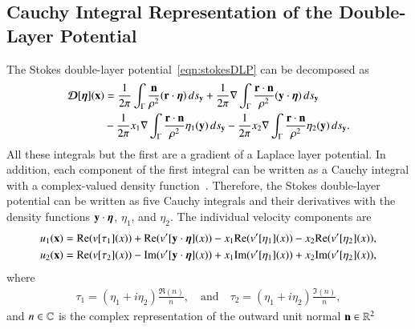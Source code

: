 \documentclass[preprint, 10pt]{elsarticle}
\begin{document}
\subsection{Cauchy Integral Representation of the Double-Layer
Potential}
The Stokes double-layer potential~\eqref{eqn:stokesDLP} can be
decomposed as
\begin{align}
  {\boldsymbol{\mathcal D}}[{\boldsymbol\eta}]({\mathbf{x}}) &= 
    \frac{1}{2\pi} \int_{\Gamma} 
      \frac{{\mathbf{n}}}{\rho^2} ({\mathbf{r}} \cdot {\boldsymbol\eta}) \, ds_{\mathbf{y}} + 
    \frac{1}{2\pi} \nabla \int_{\Gamma}
      \frac{{\mathbf{r}} \cdot {\mathbf{n}}}{\rho^2} ({\mathbf{y}} \cdot {\boldsymbol\eta}) \, ds_{\mathbf{y}} \\
    &- \frac{1}{2\pi} x_1 \nabla \int_{\Gamma}
      \frac{{\mathbf{r}} \cdot {\mathbf{n}}}{\rho^2}\eta_1({\mathbf{y}}) \, ds_{\mathbf{y}} -
    \frac{1}{2\pi} x_2 \nabla \int_{\Gamma}
      \frac{{\mathbf{r}} \cdot {\mathbf{n}}}{\rho^2}\eta_2({\mathbf{y}}) \, ds_{\mathbf{y}}.
\end{align}
All these integrals but the first are a gradient of a Laplace layer
potential.  In addition, each component of the first integral can be
written as a Cauchy integral with a complex-valued density
function~\cite{bar-wu-vee2015}.  Therefore, the Stokes double-layer
potential can be written as five Cauchy integrals and their derivatives
with the density functions ${\mathbf{y}} \cdot {\boldsymbol\eta}$, $\eta_1$, and $\eta_2$.
The individual velocity components are
\begin{align}
  \label{eqn:cauchy1}
  u_1({\mathbf{x}}) &= {\operatorname{Re}} (v[\tau_1](x)) + {\operatorname{Re}} (v'[{\mathbf{y}}\cdot{\boldsymbol\eta}](x)) 
           -x_1{\operatorname{Re}} (v'[\eta_1](x)) - x_2{\operatorname{Re}} (v'[\eta_2](x)), \\
  u_2({\mathbf{x}}) &= {\operatorname{Re}} (v[\tau_2](x)) - {\operatorname{Im}} (v'[{\mathbf{y}}\cdot{\boldsymbol\eta}](x)) 
       +x_1{\operatorname{Im}} (v'[\eta_1](x)) + x_2{\operatorname{Im}} (v'[\eta_2](x)),
\end{align}
where
\begin{align} 
  \tau_1=(\eta_1+i\eta_2)\frac{\Re(n)}{n}, \quad \text{and} \quad
  \tau_2=(\eta_1+i\eta_2)\frac{\Im(n)}{n},
\end{align}
and $n \in {\mathbb{C}}$ is the complex representation of the outward unit normal
${\mathbf{n}} \in {\mathbb{R}}^2$

\end{document}
